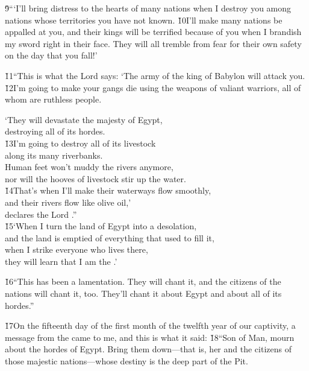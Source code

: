 \v{9}```I'll bring distress to the hearts of many nations when I destroy you among nations whose territories you have not known. \v{10}I'll make many nations be appalled at you, and their kings will be terrified because of you when I brandish my sword right in their face. They will all tremble from fear for their own safety on the day that you fall!'

\v{11}``This is what the Lord  says: `The army of the king of Babylon will attack you. \v{12}I'm going to make your gangs die using the weapons of valiant warriors, all of whom are ruthless people.

\begin{poetry}
\poeml `They will devastate the majesty of Egypt, \\
\poemll    destroying all of its hordes. \\
\poeml \v{13}I'm going to destroy all of its livestock \\
\poemll    along its many riverbanks. \\
\poeml Human feet won't muddy the rivers anymore, \\
\poemll    nor will the hooves of livestock stir up the water. \\
\poeml \v{14}That's when I'll make their waterways flow smoothly, \\
\poemll    and their rivers flow like olive oil,' \\
\poemlll       declares the Lord .'' \\
\poeml \v{15}`When I turn the land of Egypt into a desolation, \\
\poemll    and the land is emptied of everything that used to fill it, \\
\poeml when I strike everyone who lives there, \\
\poemll    they will learn that I am the .'
\end{poetry}

\v{16}``This has been a lamentation. They will chant it, and the citizens of the nations will chant it, too. They'll chant it about Egypt and about all of its hordes.''

\v{17}On the fifteenth day of the first month of the twelfth year of our captivity, a message from the  came to me, and this is what it said: \v{18}``Son of Man, mourn about the hordes of Egypt. Bring them down---that is, her and the citizens of those majestic nations---whose destiny is the deep part of the Pit.

